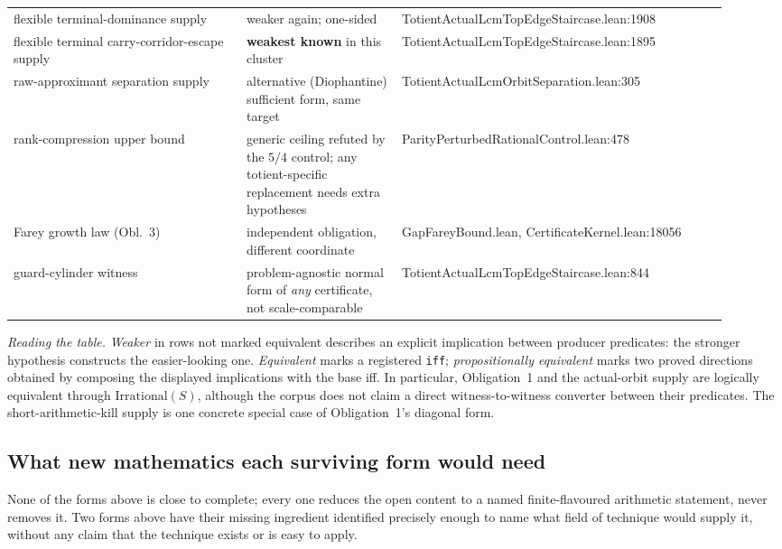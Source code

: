 \begin{center}
\begin{longtable}{p{0.30\linewidth} p{0.20\linewidth} p{0.42\linewidth}}
flexible terminal-dominance supply & weaker again; one-sided & TotientActualLcmTopEdgeStaircase.lean:1908 \\
flexible terminal carry-corridor-escape supply & \textbf{weakest known} in this cluster & TotientActualLcmTopEdgeStaircase.lean:1895 \\
raw-approximant separation supply & alternative (Diophantine) sufficient form, same target & TotientActualLcmOrbitSeparation.lean:305 \\
rank-compression upper bound & generic ceiling refuted by the $5/4$ control; any totient-specific replacement needs extra hypotheses & ParityPerturbedRationalControl.lean:478 \\
Farey growth law (Obl.\ 3) & independent obligation, different coordinate & GapFareyBound.lean, CertificateKernel.lean:18056 \\
guard-cylinder witness & problem-agnostic normal form of \emph{any} certificate, not scale-comparable & TotientActualLcmTopEdgeStaircase.lean:844 \\
\end{longtable}
\end{center}

\emph{Reading the table.} \emph{Weaker} in rows not marked
equivalent describes an explicit implication between producer predicates:
the stronger hypothesis constructs the easier-looking one.
\emph{Equivalent} marks a registered \texttt{iff};
\emph{propositionally equivalent} marks two proved directions obtained by
composing the displayed implications with the base iff.  In particular,
Obligation~1 and the actual-orbit supply are logically equivalent through
$\mathrm{Irrational}(S)$, although the corpus does not claim a direct
witness-to-witness converter between their predicates.  The
short-arithmetic-kill supply is one concrete special case of Obligation~1's
diagonal form.

\subsection{What new mathematics each surviving form would need}

None of the forms above is close to complete; every one reduces the open
content to a named finite-flavoured arithmetic statement, never removes it.
Two forms above have their missing ingredient identified precisely enough
to name what field of technique would supply it, without any claim that the
technique exists or is easy to apply.

